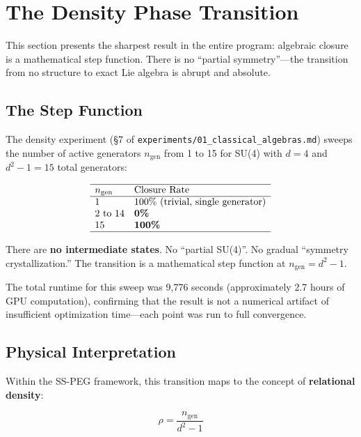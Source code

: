 \section{The Density Phase Transition}\label{sec:density}

This section presents the sharpest result in the entire program: algebraic closure is a mathematical step function. There is no ``partial symmetry''---the transition from no structure to exact Lie algebra is abrupt and absolute.

\subsection{The Step Function}\label{sec:step_function}

The density experiment (§7 of \texttt{experiments/01\_classical\_algebras.md}) sweeps the number of active generators $n_{\mathrm{gen}}$ from 1 to 15 for SU(4) with $d = 4$ and $d^2 - 1 = 15$ total generators:

\begin{equation}
\begin{array}{ll}
\hline
n_{\mathrm{gen}} & \text{Closure Rate} \\
\hline
1 & \text{100\% (trivial, single generator)} \\
2 \text{ to } 14 & \textbf{0\%} \\
15 & \textbf{100\%} \\
\hline
\end{array}
\end{equation}

There are \textbf{no intermediate states}. No ``partial SU(4)''. No gradual ``symmetry crystallization.'' The transition is a mathematical step function at $n_{\mathrm{gen}} = d^2 - 1$.

The total runtime for this sweep was 9,776 seconds (approximately 2.7 hours of GPU computation), confirming that the result is not a numerical artifact of insufficient optimization time---each point was run to full convergence.

\subsection{Physical Interpretation}\label{sec:physical_interpretation}

Within the SS-PEG framework, this transition maps to the concept of \textbf{relational density}:

\begin{equation}
\rho = \frac{n_{\mathrm{gen}}}{d^2 - 1}
\end{equation}

